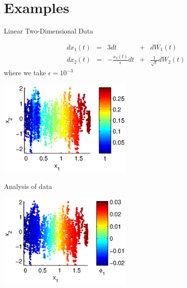 \documentclass[12pt]{beamer}
\begin{document}
\section{Examples}

\begin{frame}{Linear Two-Dimensional Data}

\begin{equation*} 
\begin{aligned}
dx_1(t) &=& 3dt &+& dW_1(t)\\
dx_2(t) &=& -\frac{x_2(t)}{\epsilon} dt &+& \frac{1}{\sqrt{\epsilon}} dW_2(t)
\end{aligned}
\end{equation*} 
where we take $\epsilon = 10^{-3}$

\includegraphics[width=0.5\textwidth]{data_init}
\end{frame}

\begin{frame}{Analysis of data}

\includegraphics[width=0.5\textwidth]{data_linear_NIV}

\end{frame}
\end{document}
